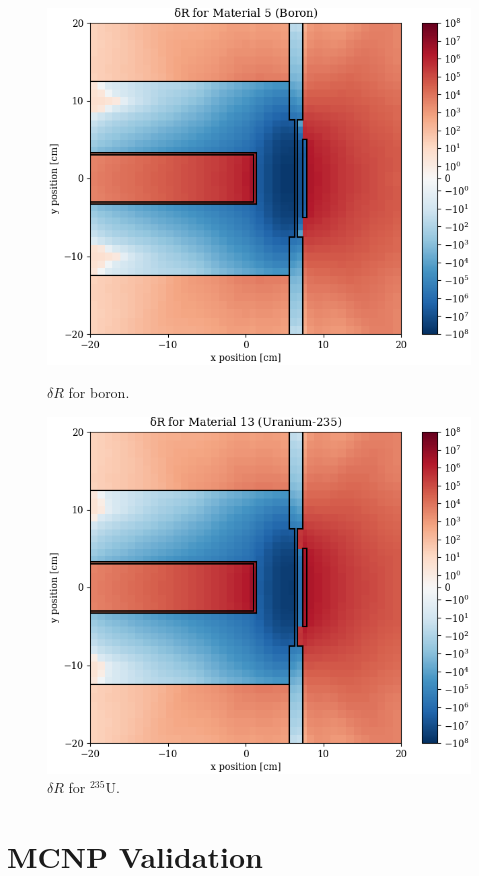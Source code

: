 \begin{figure}
  \begin{minipage}{0.49\linewidth}
    \centering
    \includegraphics[width=\linewidth]{content/testprob/dR_05.png}
    \caption{$\delta R$ for boron.}
    \label{fig:testprob:dR_05}
  \end{minipage}
  \hfill
  \begin{minipage}{0.49\linewidth}
    \centering
    \includegraphics[width=\linewidth]{content/testprob/dR_13.png}
    \caption{$\delta R$ for ${}^{235}\text{U}$.}
    \label{fig:testprob:dR_13}
  \end{minipage}
\end{figure}

\section{MCNP Validation}
\label{sec:bg:tp:mcnp}
